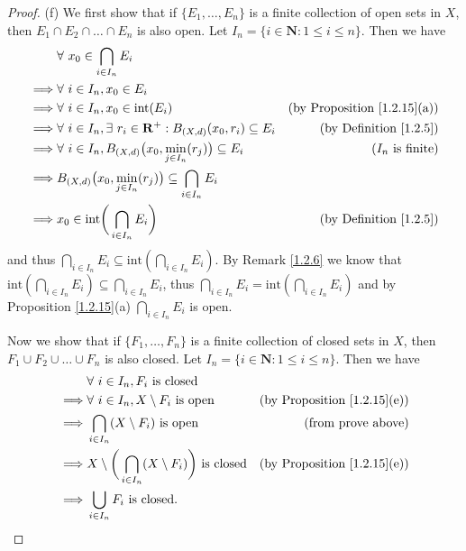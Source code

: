 \begin{proof}{(f)}
    We first show that if \(\{E_1, \dots, E_n\}\) is a finite collection of open sets in \(X\), then \(E_1 \cap E_2 \cap \dots \cap E_n\) is also open.
    Let \(I_n = \{i \in \mathbf{N} : 1 \leq i \leq n\}\).
    Then we have
    \begin{align*}
                 & \forall\ x_0 \in \bigcap_{i \in I_n} E_i                                                                                         \\
        \implies & \forall\ i \in I_n, x_0 \in E_i                                                                                                  \\
        \implies & \forall\ i \in I_n, x_0 \in \text{int}(E_i)                                            & \text{(by Proposition \ref{1.2.15}(a))} \\
        \implies & \forall\ i \in I_n, \exists\ r_i \in \mathbf{R}^+ : B_{(X, d)}(x_0, r_i) \subseteq E_i & \text{(by Definition \ref{1.2.5})}      \\
        \implies & \forall\ i \in I_n, B_{(X, d)}\big(x_0, \min_{j \in I_n}(r_j)\big) \subseteq E_i       & \text{(\(I_n\) is finite)}              \\
        \implies & B_{(X, d)}\big(x_0, \min_{j \in I_n}(r_j)\big) \subseteq \bigcap_{i \in I_n} E_i                                                 \\
        \implies & x_0 \in \text{int}\bigg(\bigcap_{i \in I_n} E_i\bigg)                                  & \text{(by Definition \ref{1.2.5})}
    \end{align*}
    and thus \(\bigcap_{i \in I_n} E_i \subseteq \text{int}(\bigcap_{i \in I_n} E_i)\).
    By Remark \ref{1.2.6} we know that \(\text{int}(\bigcap_{i \in I_n} E_i) \subseteq \bigcap_{i \in I_n} E_i\), thus \(\bigcap_{i \in I_n} E_i = \text{int}(\bigcap_{i \in I_n} E_i)\) and by Proposition \ref{1.2.15}(a) \(\bigcap_{i \in I_n} E_i\) is open.

    Now we show that if \(\{F_1, \dots, F_n\}\) is a finite collection of closed sets in \(X\), then \(F_1 \cup F_2 \cup \dots \cup F_n\) is also closed.
    Let \(I_n = \{i \in \mathbf{N} : 1 \leq i \leq n\}\).
    Then we have
    \begin{align*}
                 & \forall\ i \in I_n, F_i \text{ is closed}                                                                                 \\
        \implies & \forall\ i \in I_n, X \setminus F_i \text{ is open}                             & \text{(by Proposition \ref{1.2.15}(e))} \\
        \implies & \bigcap_{i \in I_n} (X \setminus F_i) \text{ is open}                           & \text{(from prove above)}               \\
        \implies & X \setminus \bigg(\bigcap_{i \in I_n} (X \setminus F_i)\bigg) \text{ is closed} & \text{(by Proposition \ref{1.2.15}(e))} \\
        \implies & \bigcup_{i \in I_n} F_i \text{ is closed}.
    \end{align*}
\end{proof}

